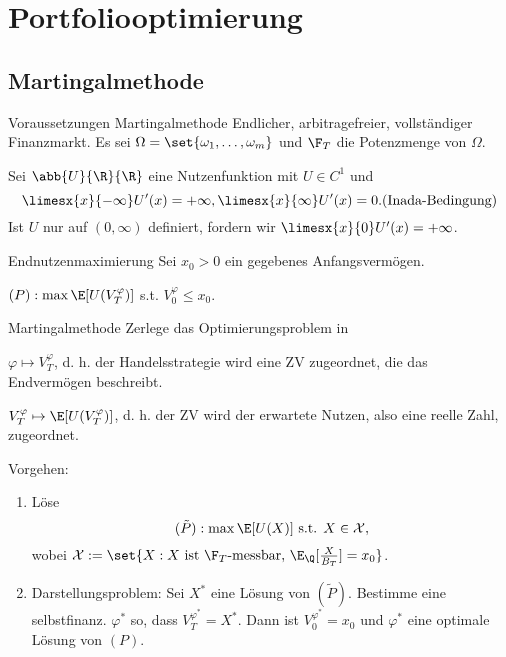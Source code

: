 \section{Portfoliooptimierung}

\subsection{Martingalmethode}

\begin{karte}{Voraussetzungen Martingalmethode}
Endlicher, arbitragefreier, vollständiger Finanzmarkt. 
Es sei \(\Omega = \set{\omega_1, \ldots, \omega_m}\) und \(\F_T\) die Potenzmenge 
von \(\Omega\).

Sei \(\abb{U}{\R}{\R}\) eine Nutzenfunktion mit \(U\in C^1\) und 
\[ \limesx{x}{-\infty} U'(x) = +\infty, \limesx{x}{\infty} U'(x) = 0. \text{(Inada-Bedingung)}\]
Ist \(U\) nur auf \((0,\infty)\) definiert, fordern wir \(\limesx{x}{0}U'(x) = +\infty\).
\end{karte}

\begin{karte}{Endnutzenmaximierung}
Sei \(x_0 > 0\) ein gegebenes Anfangsvermögen. 

\((P): \max \E[U(V_T^\varphi)]\) s.t. \(V_0^\varphi \leq x_0\).
\end{karte}

\begin{karte}{Martingalmethode}
Zerlege das Optimierungsproblem in 

\(\varphi \mapsto V_T^\varphi\), d. h. der Handelsstrategie wird eine ZV zugeordnet, die das 
Endvermögen beschreibt. 

\(V_T^\varphi \mapsto \E[U(V_T^\varphi)]\), d. h. der ZV wird der erwartete Nutzen, 
also eine reelle Zahl, zugeordnet.

Vorgehen:
\begin{enumerate}
    \item Löse 
    \[ (\tilde{P}): \max \E[U(X)] \text{ s.t. } X \in \mathcal{X}, \]
    wobei \(\mathcal{X} := \set{X: X \text{ ist } \F_T \text{-messbar, } \E_\Q[\frac{X}{B_T}] = x_0}\).
    \item Darstellungsproblem: 
    Sei \(X^*\) eine Lösung von \((\tilde{P})\). Bestimme eine selbstfinanz. \(\varphi^*\) so, dass 
    \(V_T^{\varphi^*} = X^*\). Dann ist \(V_0^{\varphi^*} = x_0\) und \(\varphi^*\) 
    eine optimale Lösung von \((P)\).
\end{enumerate}
\end{karte}

